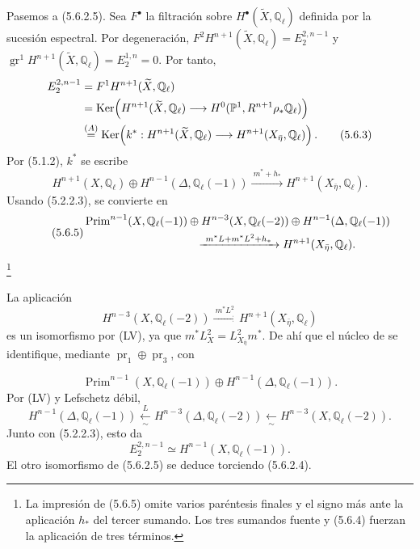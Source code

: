 Pasemos a (5.6.2.5). Sea $F^\bullet$ la filtración sobre
$H^\bullet(\widetilde X,\mathbb Q_\ell)$ definida por la sucesión
espectral. Por degeneración,
$F^2H^{n+1}(\widetilde X,\mathbb Q_\ell)=E_2^{2,n-1}$ y
$\operatorname{gr}^1H^{n+1}(\widetilde X,\mathbb Q_\ell)=E_2^{1,n}=0$.
Por tanto,
\begin{align}
E_2^{2,n-1}
 &=F^1H^{n+1}(\widetilde X,\mathbb Q_\ell) \notag\\
 &=\operatorname{Ker}\!\left(
 H^{n+1}(\widetilde X,\mathbb Q_\ell)
 \longrightarrow H^0(\mathbb P^1,R^{n+1}\rho_*\mathbb Q_\ell)
 \right) \notag\\
 &\overset{(A)}{=}
 \operatorname{Ker}\!\left(
 k^*:H^{n+1}(\widetilde X,\mathbb Q_\ell)
 \longrightarrow H^{n+1}(X_{\bar\eta},\mathbb Q_\ell)
 \right).
\tag{5.6.3}
\end{align}
Por (5.1.2), $k^*$ se escribe
\begin{equation}\tag{5.6.4}
H^{n+1}(X,\mathbb Q_\ell)
\oplus H^{n-1}(\Delta,\mathbb Q_\ell(-1))
\xrightarrow{\ m^*+h_*\ }
H^{n+1}(X_{\bar\eta},\mathbb Q_\ell).
\end{equation}
Usando (5.2.2.3), se convierte en
\begin{equation}\tag{5.6.5}
\begin{split}
&\operatorname{Prim}^{n-1}(X,\mathbb Q_\ell(-1)\sisi{}{)}
\oplus H^{n-3}(X,\mathbb Q_\ell(-2))
\oplus H^{n-1}(\Delta,\mathbb Q_\ell(-1))\\
&\hspace{35mm}\xrightarrow{\ m^*L+m^*L^2\sisi{}{+}h_*\ }
H^{n+1}(X_{\bar\eta},\mathbb Q_\ell\sisi{}{)}.
\end{split}
\end{equation}
\footnote{La impresión de (5.6.5) omite varios paréntesis finales y el
signo más ante la aplicación $h_*$ del tercer sumando. Los tres
sumandos fuente y (5.6.4) fuerzan la aplicación de tres términos.}

La aplicación
\[
H^{n-3}(X,\mathbb Q_\ell(-2))
\xrightarrow{\ m^*L^2\ }
H^{n+1}(X_{\bar\eta},\mathbb Q_\ell)
\]
es un isomorfismo por (LV), ya que
$m^*L_X^2=L_{X_{\bar\eta}}^2m^*$. De ahí que el núcleo de
 se identifique, mediante
$\operatorname{pr}_1\oplus\operatorname{pr}_3$, con

\pageoriginale

\[
\operatorname{Prim}^{n-1}(X,\mathbb Q_\ell(-1))
\oplus H^{n-1}(\Delta,\mathbb Q_\ell(-1)).
\]
Por (LV) y Lefschetz débil,
\[
H^{n-1}(\Delta,\mathbb Q_\ell(-1))
\xleftarrow[\sim]{\,L\,}
H^{n-3}(\Delta,\mathbb Q_\ell(-2))
\xleftarrow[\sim]{\ }
H^{n-3}(X,\mathbb Q_\ell(-2)).
\]
Junto con (5.2.2.3), esto da
\begin{equation}\tag{5.6.6}
E_2^{2,n-1}\simeq H^{n-1}(X,\mathbb Q_\ell(-1)).
\end{equation}
El otro isomorfismo de (5.6.2.5) se deduce torciendo (5.6.2.4).

